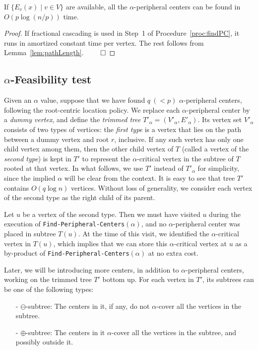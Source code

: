 \documentclass{llncs}
\newcommand{\QED}{\hfill$\qed$}
\begin{document}
{\begin{lemma}\label{lem:findPC}
If $\{E_v(x)\mid v\in V\}$ 
are available,
all the $\alpha$-peripheral centers can be found in $O(p\log(n/p))$ time.
\end{lemma}
\begin{proof}
If fractional cascading is used in Step~1 of Procedure~\ref{proc:findPC},
it runs in amortized constant time per vertex.
The rest follows from Lemma~\ref{lem:pathLength}.
\QED
\end{proof}

\subsection{$\alpha$-Feasibility test}\label{sec:test}
Given an $\alpha$ value,
suppose that we have found $q ~(<p)$ $\alpha$-peripheral centers,
following the root-centric location policy.
We replace each $\alpha$-peripheral center by a {\em dummy vertex},
and define the {\em trimmed tree} $T'_{\alpha}=(V'_{\alpha},E'_{\alpha})$.
Its vertex set $V'_{\alpha}$ consists of two types of vertices:
the {\em first type} is a vertex that lies on the path between a dummy vertex and root $r$, inclusive.
If any such vertex has only one child vertex among them,
then the other child vertex of $T$ (called a vertex of the {\em second type}) is kept in $T'$
to represent the $\alpha$-critical vertex in the subtree of $T$ rooted at that vertex.
In what follows, we use $T'$ instead of $T'_{\alpha}$ for simplicity,
since the implied $\alpha$ will be clear from the context.
It is easy to see that tree $T'$ contains $O(q\log n)$ vertices.
Without loss of generality,
we consider each vertex of the second type as the right child of its parent.

Let $u$ be a vertex of the second type.
Then we must have visited $u$ during the execution of {\tt Find-Peripheral-Centers}$(\alpha)$,
and no $\alpha$-peripheral center was placed in subtree $T(u)$.
At the time of this visit,
we identified the $\alpha$-critical vertex in $T(u)$,
which implies that we can store this $\alpha$-critical vertex at $u$ as a by-product of
{\tt Find-Peripheral-Centers}$(\alpha)$ at no extra cost.

Later, we will be introducing more centers, in addition to $\alpha$-peripheral centers,
working on the trimmed tree $T'$ bottom up.
For each vertex in $T'$,
its subtrees can be one of the following types:
\begin{enumerate}
\item[-]
$\ominus$-subtree: The centers in it, if any, do not $\alpha$-cover all the vertices in the subtree.
\item[-]
$\oplus$-subtree: The centers in it $\alpha$-cover all the vertices in the subtree, and possibly outside it.
\end{enumerate}


}
\end{document}
